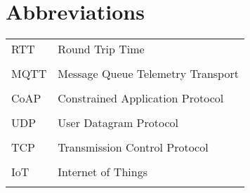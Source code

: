 \section*{Abbreviations}
\label{ch:abbreviations}

{}

\begin{table}[ht!]
    \begin{tabular}{l l}
        RTT & Round Trip Time \\\\
        MQTT & Message Queue Telemetry Transport \\\\
        CoAP & Constrained Application Protocol \\\\
        UDP & User Datagram Protocol  \\\\
        TCP & Transmission Control Protocol  \\\\
        IoT & Internet of Things  \\\\
    \end{tabular}
\end{table}